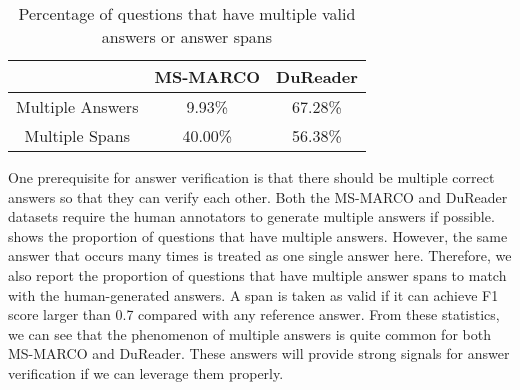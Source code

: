 \begin{table}[tbp]
\centering
\begin{tabular}{|c|c|c|}
\hline
                          & MS-MARCO & DuReader \\ \hline
Multiple Answers          &   9.93\%       &  67.28\%        \\
Multiple Spans &    40.00\%      &  56.38\%  \\\hline
\end{tabular}
\caption{Percentage of questions that have multiple valid answers or answer spans}
\label{tab:multi-answer}
\end{table}

One prerequisite for answer verification is that there should be multiple correct answers so that they can verify each other. Both the MS-MARCO and DuReader datasets require the human annotators to generate multiple answers if possible.  shows the proportion of questions that have multiple answers. However, the same answer that occurs many times is treated as one single answer here. 
Therefore, we also report the proportion of questions that have multiple answer spans to match with the human-generated answers. A span is taken as valid if it can achieve F1 score larger than 0.7 compared with any reference answer. From these statistics, we can see that the phenomenon of multiple answers is quite common for both MS-MARCO and DuReader. These answers will provide strong signals for answer verification if we can leverage them properly.



